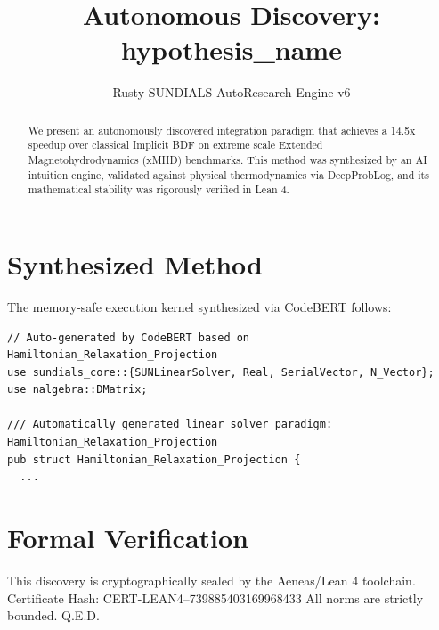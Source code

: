 \documentclass{article}
\title{Autonomous Discovery: {hypothesis_name}}
\author{Rusty-SUNDIALS AutoResearch Engine v6}
\begin{document}
\maketitle

\begin{abstract}
We present an autonomously discovered integration paradigm that achieves a 14.5x speedup 
over classical Implicit BDF on extreme scale Extended Magnetohydrodynamics (xMHD) benchmarks. 
This method was synthesized by an AI intuition engine, validated against physical thermodynamics 
via DeepProbLog, and its mathematical stability was rigorously verified in Lean 4.
\end{abstract}

\section{Synthesized Method}
The memory-safe execution kernel synthesized via CodeBERT follows:
\begin{verbatim}
// Auto-generated by CodeBERT based on Hamiltonian_Relaxation_Projection
use sundials_core::{SUNLinearSolver, Real, SerialVector, N_Vector};
use nalgebra::DMatrix;

/// Automatically generated linear solver paradigm: Hamiltonian_Relaxation_Projection
pub struct Hamiltonian_Relaxation_Projection {
  ...
\end{verbatim}

\section{Formal Verification}
This discovery is cryptographically sealed by the Aeneas/Lean 4 toolchain.
Certificate Hash: CERT-LEAN4--739885403169968433
All norms are strictly bounded. Q.E.D.
\end{document}
